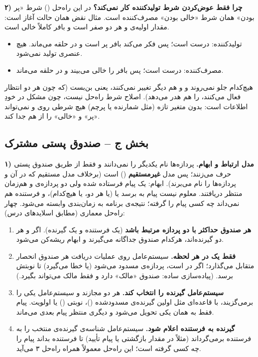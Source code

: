 \textbf{۲) چرا فقط عوض‌کردن شرط تولیدکننده کار نمی‌کند؟} در این راه‌حل () شرط «پر بودن» همان شرط «خالی بودن» مصرف‌کننده است. مثال نقض همان حالت آغاز است: مقدار اولیه‌ی  و  هر دو صفر است و بافر کاملاً خالی است.
\begin{itemize}
  \item تولیدکننده:  درست است؛ پس فکر می‌کند بافر پر است و در حلقه می‌ماند. هیچ عنصری تولید نمی‌شود.
  \item مصرف‌کننده:  درست است؛ پس بافر را خالی می‌بیند و در حلقه می‌ماند.
\end{itemize}
هیچ‌کدام جلو نمی‌روند و  و  هم دیگر تغییر نمی‌کنند، یعنی بن‌بست (که چون هر دو انتظار فعال می‌کنند،  را هم هدر می‌دهد). اصلاح شرط راه‌حل نیست، چون مشکل در خودِ اطلاعات است: بدون متغیر تازه (مثل شمارنده یا پرچم) هیچ شرطی روی  و  نمی‌تواند «پر» و «خالی» را از هم جدا کند.

\subsection*{بخش ج – صندوق پستی مشترک}

\textbf{۱) مدل ارتباط و ابهام.} پردازه‌ها نام یکدیگر را نمی‌دانند و فقط از طریق صندوق پستی  حرف می‌زنند؛ پس مدل \textbf{غیرمستقیم} () است (برخلاف مدل مستقیم که در آن  و  پردازه‌ها را نام می‌برند). ابهام: یک پیام فرستاده شده ولی دو پردازه‌ی  و  هم‌زمان منتظر دریافتند. معلوم نیست پیام به  برسد یا  (یا هر دو، یا هیچ‌کدام)، و فرستنده هم نمی‌داند چه کسی پیام را گرفته؛ نتیجه‌ی برنامه به زمان‌بندی وابسته می‌شود. چهار راه‌حل معماری (مطابق اسلایدهای درس):
\begin{enumerate}
  \item \textbf{هر صندوق حداکثر با دو پردازه مرتبط باشد} (یک فرستنده و یک گیرنده). اگر  و  هر دو گیرنده‌اند، هرکدام صندوق جداگانه می‌گیرند و ابهام ریشه‌کن می‌شود.
  \item \textbf{فقط یک  در هر لحظه.} سیستم‌عامل روی عملیات دریافت هر صندوق انحصار متقابل می‌گذارد؛ اگر  در  است،  پردازه‌ی  مسدود می‌شود (یا خطا می‌گیرد) تا نوبتش برسد. (پیاده‌سازی ساده: صندوق «مالک» دارد و فقط مالک می‌تواند بگیرد.)
  \item \textbf{سیستم‌عامل گیرنده را انتخاب کند.} هر دو  مجازند و سیستم‌عامل یکی را برمی‌گزیند، با قاعده‌ای مثل اولین گیرنده‌ی مسدودشده ()، نوبتی () یا اولویت. پیام فقط به همان یکی تحویل می‌شود و دیگری منتظر پیام بعدی می‌ماند.
  \item \textbf{گیرنده به فرستنده اعلام شود.} سیستم‌عامل شناسه‌ی گیرنده‌ی منتخب را به فرستنده برمی‌گرداند (مثلاً در مقدار بازگشتی یا پیام تأیید) تا فرستنده بداند پیام را چه کسی گرفته است؛ این راه‌حل معمولاً همراه راه‌حل ۳ می‌آید.
\end{enumerate}

